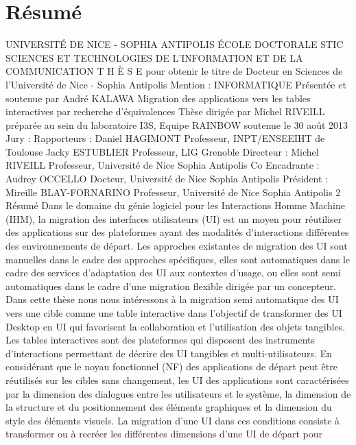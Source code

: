 \documentclass{article}
\begin{document}
\section*{Résumé}
UNIVERSITÉ DE NICE - SOPHIA ANTIPOLIS
ÉCOLE DOCTORALE STIC
SCIENCES ET TECHNOLOGIES DE L’INFORMATION
ET DE LA COMMUNICATION
T H È S E
pour obtenir le titre de
Docteur en Sciences
de l’Universit\'{e} de Nice - Sophia Antipolis
Mention : INFORMATIQUE
Pr\'{e}sent\'{e}e et soutenue par
Andr\'{e} KALAWA
Migration des applications vers les tables
interactives par recherche d’\'{e}quivalences
Th\`{e}se dirig\'{e}e par Michel RIVEILL
pr\'{e}par\'{e}e au sein du laboratoire I3S, Equipe RAINBOW
soutenue le 30 ao\^{u}t 2013
Jury :
Rapporteurs :
Daniel HAGIMONT
Professeur, INPT/ENSEEIHT de Toulouse
Jacky ESTUBLIER
Professeur, LIG Grenoble
Directeur :
Michel RIVEILL
Professeur, Universit\'{e} de Nice Sophia Antipolis
Co Encadrante :
Audrey OCCELLO
Docteur, Universit\'{e} de Nice Sophia Antipolis
Pr\'{e}sident :
Mireille BLAY-FORNARINO
Professeur, Universit\'{e} de Nice Sophia Antipolis
2
R\'{e}sum\'{e}
Dans le domaine du g\'{e}nie logiciel pour les Interactions Homme Machine (IHM), la migration des interfaces
utilisateurs (UI) est un moyen pour r\'{e}utiliser des applications sur des plateformes ayant des modalit\'{e}s d’interactions diff\'{e}rentes des environnements de d\'{e}part. Les approches existantes de migration des UI sont manuelles
dans le cadre des approches sp\'{e}ciﬁques, elles sont automatiques dans le cadre des services d’adaptation des UI
aux contextes d’usage, ou elles sont semi automatiques dans le cadre d’une migration ﬂexible dirig\'{e}e par un
concepteur.
Dans cette th\`{e}se nous nous int\'{e}ressons \`{a} la migration semi automatique des UI vers une cible comme une
table interactive dans l’objectif de transformer des UI Desktop en UI qui favorisent la collaboration et l’utilisation des objets tangibles. Les tables interactives sont des plateformes qui disposent des instruments d’interactions permettant de d\'{e}crire des UI tangibles et multi-utilisateurs. En consid\'{e}rant que le noyau fonctionnel
(NF) des applications de d\'{e}part peut \^{e}tre r\'{e}utilis\'{e}s sur les cibles sans changement, les UI des applications sont
caract\'{e}ris\'{e}es par la dimension des dialogues entre les utilisateurs et le syst\`{e}me, la dimension de la structure et
du positionnement des \'{e}l\'{e}ments graphiques et la dimension du style des \'{e}l\'{e}ments visuels. La migration d’une
UI dans ces conditions consiste \`{a} transformer ou \`{a} recr\'{e}er les diff\'{e}rentes dimensions d’une UI de d\'{e}part pour
\end{document}
